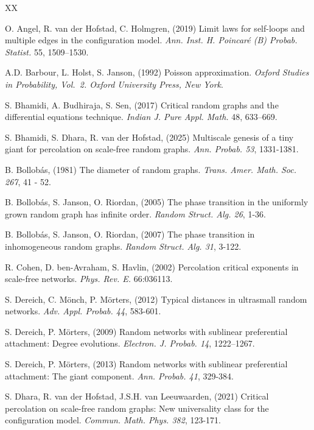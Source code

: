 \documentclass[12pt,a4paper]{article}
\numberwithin{equation}{section}
\begin{document}
{ %
\begin{thebibliography}{XX}

 O. Angel, R. van der Hofstad, C. Holmgren, (2019)
Limit laws for self-loops and multiple edges in the configuration model.
\textit{Ann. Inst. H. Poincaré (B) Probab. Statist.} 55, 1509–1530.

 A.D. Barbour, L. Holst, S. Janson, (1992)
Poisson approximation.
\textit{Oxford Studies in Probability, Vol.~2. Oxford University Press, New York}.

S. Bhamidi, A. Budhiraja, S. Sen, (2017) 
Critical random graphs and the differential equations technique. 
\textit{Indian J. Pure Appl. Math.} 48, 633–669.

S. Bhamidi, S. Dhara, R. van der Hofstad, (2025)
Multiscale genesis of a tiny giant for percolation on scale-free random graphs.
\textit{Ann. Probab. 53}, 1331-1381.



	  B. Bollob\'{a}s, (1981) The diameter of random graphs.
         \textit{Trans. Amer. Math. Soc. 267}, 41 - 52.
 
         B. Bollob\'{a}s, S. Janson, O. Riordan, (2005) The phase transition in the uniformly grown random graph has infinite order.
	\textit{Random Struct. Alg. 26}, 1-36.
        
         B. Bollob\'{a}s, S. Janson, O. Riordan, (2007) The phase transition in inhomogeneous random graphs. 
          \textit{Random Struct. Alg. 31},  3-122.
          
           R. Cohen, D. ben-Avraham, S. Havlin, (2002) Percolation critical exponents in scale-free networks.
           \textit{Phys. Rev. E.} 66:036113. 
           
            S. Dereich, C. Mönch, P. Mörters, (2012) Typical distances in ultrasmall random networks.
	\textit{Adv. Appl. Probab. 44}, 583-601.

           
            S. Dereich, P. Mörters, (2009) Random networks with sublinear preferential attachment: Degree evolutions.
         \textit{Electron. J. Probab. 14}, 1222–1267.

          S. Dereich, P. Mörters, (2013) Random networks with sublinear preferential attachment: The giant component.
         \textit{Ann. Probab. 41}, 329-384.

         	
S. Dhara, R. van der Hofstad,
         J.S.H. van Leeuwaarden,
(2021) Critical percolation on scale-free random graphs: New universality class for the configuration model.
\textit{Commun. Math. Phys.  382},
123-171.




\end{thebibliography}}
\end{document}
